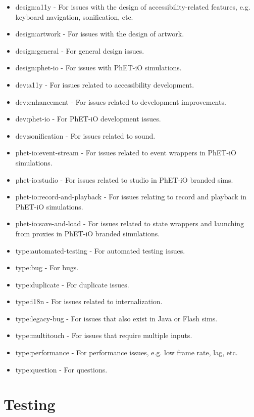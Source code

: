 \documentclass[titlepage]{article}
\begin{document}
		\begin{itemize}
			\item design:a11y - For issues with the design of accessibility-related features, e.g. keyboard navigation, sonification, etc.
			\item design:artwork - For issues with the design of artwork.
			\item design:general - For general design issues.
			\item design:phet-io - For issues with PhET-iO simulations.
			\item dev:a11y - For issues related to accessibility development.
			\item dev:enhancement - For issues related to development improvements.
			\item dev:phet-io - For PhET-iO development issues.
			\item dev:sonification - For issues related to sound.
			\item phet-io:event-stream - For issues related to event wrappers in PhET-iO simulations.
			\item phet-io:studio - For issues related to studio in PhET-iO branded sims.
			\item phet-io:record-and-playback - For issues relating to record and playback in PhET-iO simulations.
			\item phet-io:save-and-load - For issues related to state wrappers and launching from proxies in PhET-iO branded simulations.
			\item type:automated-testing - For automated testing issues.
			\item type:bug - For bugs.
			\item type:duplicate - For duplicate issues.
			\item type:i18n - For issues related to internalization.
			\item type:legacy-bug - For issues that also exist in Java or Flash sims.
			\item type:multitouch - For issues that require multiple inputs.
			\item type:performance - For performance issues, e.g. low frame rate, lag, etc.
			\item type:question - For questions.
		\end{itemize}

\pagebreak


\section{Testing}
\end{document}
